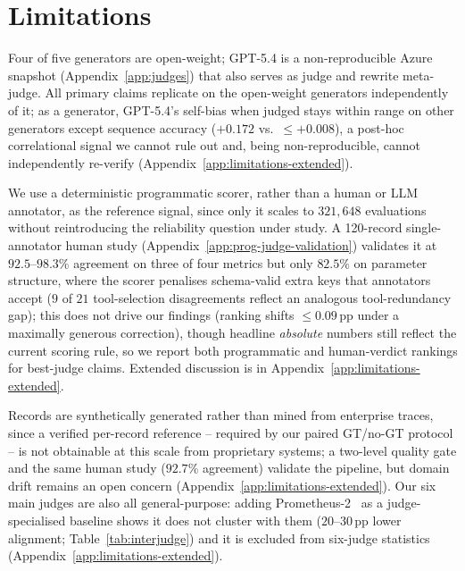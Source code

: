 \section*{Limitations}
\label{app:limitations}

Four of five generators are open-weight; GPT-5.4 is a non-reproducible Azure snapshot (Appendix~\ref{app:judges}) that also serves as judge and rewrite meta-judge. All primary claims replicate on the open-weight generators independently of it; as a generator, GPT-5.4's self-bias when judged stays within range on other generators except sequence accuracy ($+0.172$ vs.\ $\leq+0.008$), a post-hoc correlational signal we cannot rule out and, being non-reproducible, cannot independently re-verify (Appendix~\ref{app:limitations-extended}).

We use a deterministic programmatic scorer, rather than a human or LLM annotator, as the reference signal, since only it scales to $321{,}648$ evaluations without reintroducing the reliability question under study. A 120-record single-annotator human study (Appendix~\ref{app:prog-judge-validation}) validates it at $92.5$--$98.3\%$ agreement on three of four metrics but only $82.5\%$ on parameter structure, where the scorer penalises schema-valid extra keys that annotators accept ($9$ of $21$ tool-selection disagreements reflect an analogous tool-redundancy gap); this does not drive our findings (ranking shifts $\leq0.09$\,pp under a maximally generous correction), though headline \emph{absolute} numbers still reflect the current scoring rule, so we report both programmatic and human-verdict rankings for best-judge claims. Extended discussion is in Appendix~\ref{app:limitations-extended}.

Records are synthetically generated rather than mined from enterprise traces, since a verified per-record reference -- required by our paired GT/no-GT protocol -- is not obtainable at this scale from proprietary systems; a two-level quality gate and the same human study ($92.7\%$ agreement) validate the pipeline, but domain drift remains an open concern (Appendix~\ref{app:limitations-extended}). Our six main judges are also all general-purpose: adding Prometheus-2~\citep{kim2024prometheus2} as a judge-specialised baseline shows it does not cluster with them ($20$--$30$\,pp lower alignment; Table~\ref{tab:interjudge}) and it is excluded from six-judge statistics (Appendix~\ref{app:limitations-extended}).

